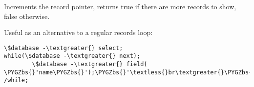 \documentclass[letterpaper,10pt,english]{sphinxmanual}
\def\PYGZbs{\char`\\}
\begin{document}
\begin{fulllineitems}

\begin{fulllineitems}
\label{knop_database:knop_database.maxrecords_value}
\end{fulllineitems}



\begin{fulllineitems}
\end{fulllineitems}


\begin{fulllineitems}
\label{knop_database:knop_database.message}
\end{fulllineitems}



\begin{fulllineitems}
\end{fulllineitems}


\begin{fulllineitems}
\label{knop_database:knop_database.next}
Increments the record pointer, returns true if there are more records to show,
false otherwise.

Useful as an alternative to a regular records loop:

\begin{Verbatim}[commandchars=\\\{\}]
\$database -\textgreater{} select;
while(\$database -\textgreater{} next);
        \$database -\textgreater{} field( \PYGZbs{}'name\PYGZbs{}');\PYGZbs{}'\textless{}br\textgreater{}\PYGZbs{}';
/while;
\end{Verbatim}

\end{fulllineitems}


\begin{fulllineitems}
\label{knop_database:knop_database.oncreate}
\end{fulllineitems}


\end{fulllineitems}
\end{document}
